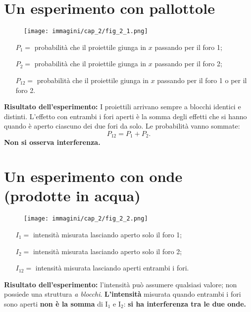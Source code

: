 \documentclass[a4paper,12pt,oneside]{book}
\begin{document}
\section*{Un esperimento con pallottole}
\begin{figure}[!htbp]
\begin{center}
\texttt{[image: immagini/cap\_2/fig\_2\_1.png]}
\end{center}
\end{figure}
\begin{itemize}
\item[$P_1=$ ]probabilità che il proiettile giunga in $x$ passando per il foro 1;
\item[$P_2=$ ]probabilità che il proiettile giunga in $x$ passando per il foro 2;
\item[$P_{12}=$ ]probabilità che il proiettile giunga in $x$ passando per il foro 1 o per il foro 2.
\end{itemize}
\textbf{Risultato dell'esperimento:} I proiettili arrivano sempre a blocchi identici e distinti. L'effetto con entrambi i fori aperti è la somma degli effetti che si hanno quando è aperto ciascuno dei due fori da solo. Le probabilità vanno sommate:
	\begin{equation}
	\boxed{
		P_{12}=P_1+P_2.
		}
\end{equation}
\textbf{Non si osserva interferenza.}
\newpage
\section*{Un esperimento con onde (prodotte in acqua)}
\begin{figure}[!htbp]
\begin{center}
\texttt{[image: immagini/cap\_2/fig\_2\_2.png]}
\end{center}
\end{figure}
\begin{itemize}
\item[$I_1=$ ]intensità misurata lasciando aperto solo il foro 1;
\item[$I_2=$ ]intensità misurata lasciando aperto solo il foro 2;
\item[$I_{12}=$ ]intensità misurata lasciando aperti entrambi i fori.
\end{itemize}
\textbf{Risultato dell'esperimento:} l'intensità  può assumere qualsiasi valore; non possiede una struttura \textit{a blocchi}. \textbf{L'intensità} misurata quando entrambi i fori sono aperti \textbf{non è la somma} di I$_1$ e I$_2$: \textbf{si ha interferenza tra le due onde.}
\end{document}
